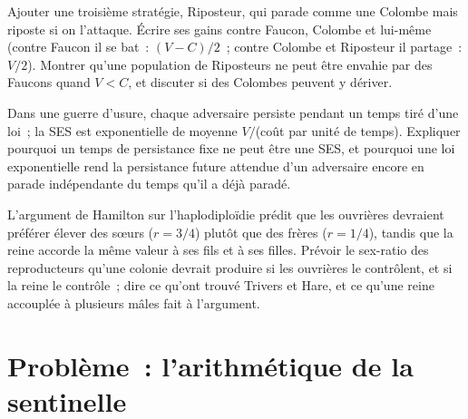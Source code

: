 \begin{exercise}[$\star\star\star$]\label{exo:b3:behavioural-ecology:10}
Ajouter une troisième stratégie, Riposteur, qui parade comme une
Colombe mais riposte si on l'attaque. Écrire ses gains contre Faucon,
Colombe et lui-même (contre Faucon il se bat~: $(V - C)/2$~; contre
Colombe et Riposteur il partage~: $V/2$). Montrer qu'une population de
Riposteurs ne peut être envahie par des Faucons quand $V < C$, et
discuter si des Colombes peuvent y dériver.
\end{exercise}

\begin{exercise}[$\star\star\star$]\label{exo:b3:behavioural-ecology:11}
Dans une guerre d'usure, chaque adversaire persiste pendant un temps
tiré d'une loi~; la SES est exponentielle de moyenne $V/$(coût par unité
de temps). Expliquer pourquoi un temps de persistance fixe ne peut être
une SES, et pourquoi une loi exponentielle rend la persistance future
attendue d'un adversaire encore en parade indépendante du temps qu'il a
déjà paradé.
\end{exercise}

\begin{exercise}[$\star\star\star$]\label{exo:b3:behavioural-ecology:12}
L'argument de Hamilton sur l'haplodiploïdie prédit que les ouvrières
devraient préférer élever des sœurs ($r = 3/4$) plutôt que des frères
($r = 1/4$), tandis que la reine accorde la même valeur à ses fils et à
ses filles. Prévoir le sex-ratio des reproducteurs qu'une colonie
devrait produire si les ouvrières le contrôlent, et si la reine le
contrôle~; dire ce qu'ont trouvé Trivers et Hare, et ce qu'une reine
accouplée à plusieurs mâles fait à l'argument.
\end{exercise}

\section{Problème~: l'arithmétique de la sentinelle}

